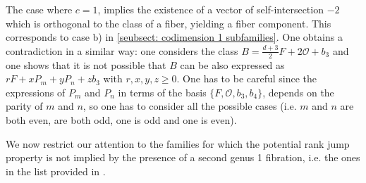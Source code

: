\documentclass{amsart}
\theoremstyle{definition}
\numberwithin{equation}{section}
\renewcommand{\O}{\mathcal{O}}
\begin{document}
The case where $c=1$, implies the existence of a vector of self-intersection $-2$ which is orthogonal to the class of a fiber, yielding a fiber component. This corresponds to case b) in \ref{seubsect: codimension 1 subfamilies}. One obtains a contradiction in a similar way: one considers the class $B=\frac{d+3}{2}F+2\O+b_3$ and one shows that it is not possible that $B$ can be also expressed as $rF+xP_{m}+yP_{n}+zb_3$ with $r,x,y,z\geq 0$. One has to be careful since the expressions of $P_m$ and $P_n$ in terms of the basis $\{F,\mathcal{O},b_3,b_4\}$, depends on the parity of $m$ and $n$, so one has to consider all the possible cases (i.e. $m$ and $n$ are both even, are both odd, one is odd and one is even). \endproof


We now restrict our attention to the families for which the potential rank jump property is not implied by the presence of a second genus 1 fibration, i.e. the ones in the list provided in \cite{GM}.
\end{document}
